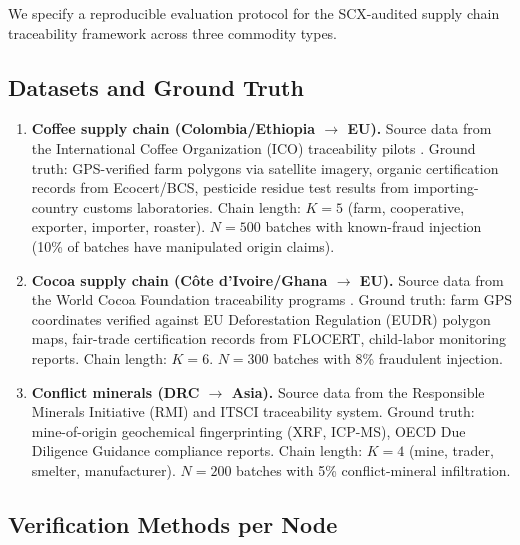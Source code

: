 \documentclass[11pt,a4paper]{article}
\theoremstyle{definition}
\theoremstyle{remark}
\newcommand{\SCX}{\textsc{SCX}}
\begin{document}
We specify a reproducible evaluation protocol for the \SCX{}-audited supply chain traceability framework across three commodity types.

\subsection{Datasets and Ground Truth}

\begin{enumerate}[label=(\arabic*)]
    \item \textbf{Coffee supply chain  (Colombia/Ethiopia $\to$ EU).} Source data from the International Coffee Organization (ICO) traceability pilots \cite{ico2023traceability}. Ground truth: GPS-verified farm polygons via satellite imagery, organic certification records from Ecocert/BCS, pesticide residue test results from importing-country customs laboratories. Chain length: $K = 5$ (farm, cooperative, exporter, importer, roaster). $N = 500$ batches with known-fraud injection (10\% of batches have manipulated origin claims).
    
    \item \textbf{Cocoa supply chain  (C\^ote d'Ivoire/Ghana $\to$ EU).} Source data from the World Cocoa Foundation traceability programs \cite{wcf2022traceability}. Ground truth: farm GPS coordinates verified against EU Deforestation Regulation (EUDR) polygon maps, fair-trade certification records from FLOCERT, child-labor monitoring reports. Chain length: $K = 6$. $N = 300$ batches with 8\% fraudulent injection.
    
    \item \textbf{Conflict minerals  (DRC $\to$ Asia).} Source data from the Responsible Minerals Initiative (RMI) and ITSCI traceability system. Ground truth: mine-of-origin geochemical fingerprinting (XRF, ICP-MS), OECD Due Diligence Guidance compliance reports. Chain length: $K = 4$ (mine, trader, smelter, manufacturer). $N = 200$ batches with 5\% conflict-mineral infiltration.
\end{enumerate}

\subsection{Verification Methods per Node}
\end{document}
